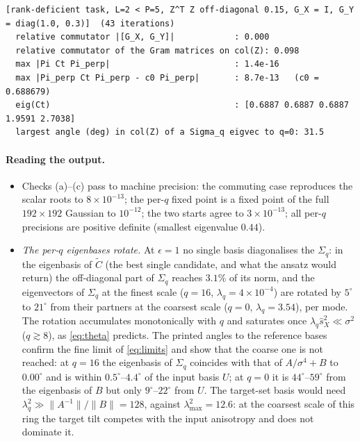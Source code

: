 \documentclass[11pt,a4paper]{article}
\newcommand{\Ct}{\tilde C}
\begin{document}
{\begin{verbatim}
[rank-deficient task, L=2 < P=5, Z^T Z off-diagonal 0.15, G_X = I, G_Y = diag(1.0, 0.3)]  (43 iterations)
  relative commutator |[G_X, G_Y]|            : 0.000
  relative commutator of the Gram matrices on col(Z): 0.098
  max |Pi Ct Pi_perp|                         : 1.4e-16
  max |Pi_perp Ct Pi_perp - c0 Pi_perp|       : 8.7e-13   (c0 = 0.688679)
  eig(Ct)                                     : [0.6887 0.6887 0.6887 1.9591 2.7038]
  largest angle (deg) in col(Z) of a Sigma_q eigvec to q=0: 31.5
\end{verbatim}
}

\paragraph{Reading the output.}
\begin{itemize}
  \item Checks (a)--(c) pass to machine precision: the commuting case reproduces the scalar roots to $8\times10^{-13}$; the per-$q$ fixed point is a fixed point of the full $192\times192$ Gaussian to $10^{-12}$; the two starts agree to $3\times10^{-13}$; all per-$q$ precisions are positive definite (smallest eigenvalue $0.44$).
  \item \emph{The per-$q$ eigenbases rotate.} At $\epsilon = 1$ no single basis diagonalises the $\Sigma_q$: in the eigenbasis of $\Ct$ (the best single candidate, and what the ansatz would return) the off-diagonal part of $\Sigma_q$ reaches $3.1\%$ of its norm, and the eigenvectors of $\Sigma_q$ at the finest scale ($q = 16$, $\lambda_q = 4\times10^{-4}$) are rotated by $5^\circ$ to $21^\circ$ from their partners at the coarsest scale ($q = 0$, $\lambda_q = 3.54$), per mode. The rotation accumulates monotonically with $q$ and saturates once $\lambda_q\hat s_X^2 \ll \sigma^2$ ($q \gtrsim 8$), as \eqref{eq:theta} predicts. The printed angles to the reference bases confirm the fine limit of \eqref{eq:limits} and show that the coarse one is not reached: at $q = 16$ the eigenbasis of $\Sigma_q$ coincides with that of $A/\sigma^4 + B$ to $0.00^\circ$ and is within $0.5^\circ$--$4.4^\circ$ of the input basis $U$; at $q = 0$ it is $44^\circ$--$59^\circ$ from the eigenbasis of $B$ but only $9^\circ$--$22^\circ$ from $U$. The target-set basis would need $\lambda_q^2 \gg \|A^{-1}\|/\|B\| = 128$, against $\lambda_{\max}^2 = 12.6$: at the coarsest scale of this ring the target tilt competes with the input anisotropy and does not dominate it.

\end{itemize}
\end{document}
